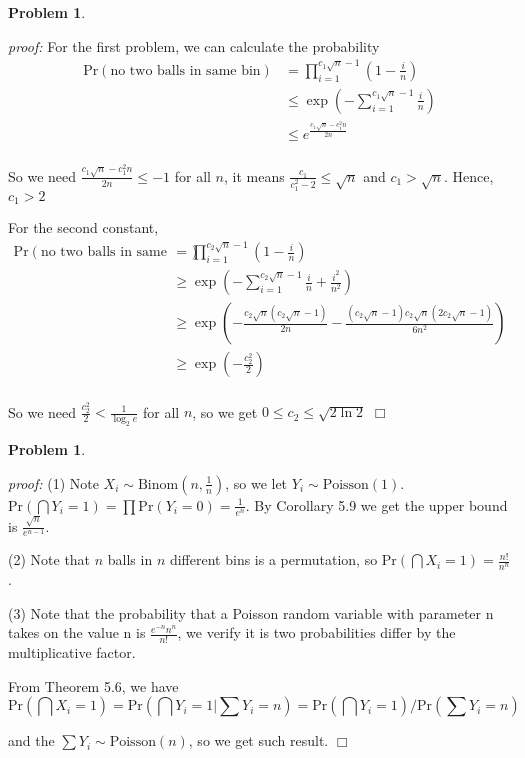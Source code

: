 \documentclass{article}
\newtheorem{problem}[theorem]{Problem}
\newenvironment{solution}{\noindent \textit{proof:}}{$\Box$}
\begin{document}
\begin{problem}
\end{problem}
\begin{solution}
    For the first problem, we can calculate the probability
    \begin{align*}
        \mathrm{Pr}(\text{no two balls in same bin}) 
        &= \prod_{i=1}^{c_1\sqrt{n}-1}\left(1-\frac i n\right) \\
        &\leq \exp (-\sum_{i=1}^{c_1\sqrt{n}-1} \frac i n) \\
        &\leq  e^{\frac {c_1\sqrt{n}-c_1^2n} {2n}} \\
    \end{align*}
    
    So we need $\frac {c_1\sqrt{n}-c_1^2n} {2n} \leq -1$ for all $n$, it means $\frac {c_1} {c_1^2-2} \leq \sqrt{n}$ and $c_1 > \sqrt{n}$. Hence, $c_1 > 2$
    
    For the second constant, 
    \begin{align*}
        \mathrm{Pr}(\text{no two balls in same bin}) 
        &= \prod_{i=1}^{c_2\sqrt{n}-1}\left(1-\frac i n\right) \\
        &\geq \exp (-\sum_{i=1}^{c_2\sqrt{n}-1} \frac i n + \frac {i^2} {n^2}) \\
        &\geq \exp (- \frac {c_2\sqrt{n}(c_2\sqrt{n}-1)} {2n} - \frac {(c_2\sqrt{n}-1)c_2\sqrt{n}(2c_2\sqrt{n}-1)} {6n^2} )  \\
        &\geq \exp (- \frac {c_2^2} {2} )  \\
    \end{align*}
    
    So we need $\frac {c_2^2} {2}  < \frac 1 {\log_2 e} $ for all $n$, so we get
    $0 \leq c_2 \leq \sqrt{2\ln 2}$
\end{solution}

\begin{problem}
\end{problem}
\begin{solution}
    (1) Note $X_i \sim \text{Binom}(n, \frac 1 n)$, so we let $Y_i \sim \text{Poisson}(1)$.
    $\mathrm{Pr}(\bigcap Y_i=1) = \prod \mathrm{Pr}(Y_i=0) = \frac 1 {e^n}$. By Corollary 5.9 we get the upper bound is $\frac {\sqrt{n}} {e^{n-1}}$.
    
    (2) Note that $n$ balls in $n$ different bins is a permutation, so $\mathrm{Pr}(\bigcap X_i=1) = \frac {n!} {n^n}$.
    
    (3) Note that the probability that a Poisson random variable with parameter n takes on the value n is $\frac {e^{-n}n^n} {n!}$, we verify it is two probabilities differ by the multiplicative factor.
    
    From Theorem 5.6, we have 
    $$
    \mathrm{Pr}(\bigcap X_i=1)=\mathrm{Pr}(\bigcap Y_i=1|\sum Y_i = n) = 
    \mathrm{Pr}(\bigcap Y_i=1)/\mathrm{Pr}(\sum Y_i = n)
    $$
    
    and the $\sum Y_i \sim \text{Poisson}(n)$, so we get such result.
\end{solution}
\end{document}
